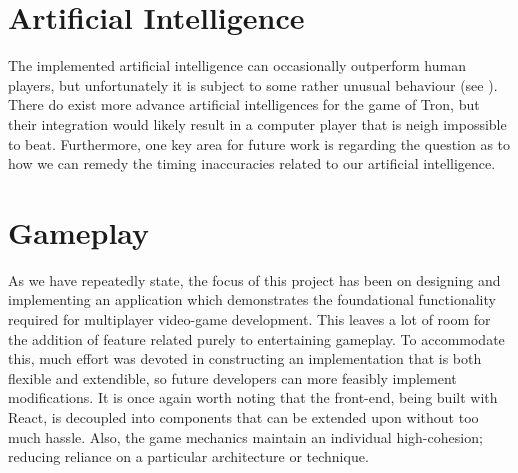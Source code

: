 \documentclass{standalone}
\begin{document}
	\section{Artificial Intelligence}
		The implemented artificial intelligence can occasionally outperform human players, but unfortunately it is subject to some rather unusual behaviour (see ). There do exist more advance artificial intelligences for the game of Tron, but their integration would likely result in a computer player that is neigh impossible to beat. Furthermore, one key area for future work is regarding the question as to how we can remedy the timing inaccuracies related to our artificial intelligence.

	\section{Gameplay}
		As we have repeatedly state, the focus of this project has been on designing and implementing an application which demonstrates the foundational functionality required for multiplayer video-game development. This leaves a lot of room for the addition of feature related purely to entertaining gameplay. To accommodate this, much effort was devoted in constructing an implementation that is both flexible and extendible, so future developers can more feasibly implement modifications. It is once again worth noting that the front-end, being built with React, is decoupled into components that can be extended upon without too much hassle. Also, the game mechanics maintain an individual high-cohesion; reducing reliance on a particular architecture or technique.
\end{document}
